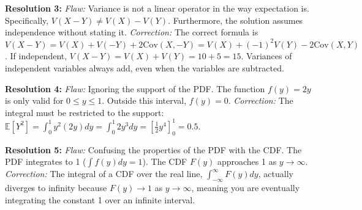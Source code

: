 \documentclass[11pt, a4paper]{article}
\theoremstyle{definition}
\theoremstyle{remark}
\newcommand{\E}{\mathbb{E}}
\begin{document}
\textbf{Resolution 3:} \textit{Flaw:} Variance is not a linear operator in the way expectation is. Specifically, $V(X - Y) \neq V(X) - V(Y)$. Furthermore, the solution assumes independence without stating it.
\textit{Correction:} The correct formula is $V(X - Y) = V(X) + V(-Y) + 2\text{Cov}(X, -Y) = V(X) + (-1)^2 V(Y) - 2\text{Cov}(X, Y)$. If independent, $V(X - Y) = V(X) + V(Y) = 10 + 5 = 15$. Variances of independent variables always add, even when the variables are subtracted.

\textbf{Resolution 4:} \textit{Flaw:} Ignoring the support of the PDF. The function $f(y) = 2y$ is only valid for $0 \le y \le 1$. Outside this interval, $f(y) = 0$.
\textit{Correction:} The integral must be restricted to the support: $\E[Y^2] = \int_{0}^{1} y^2 (2y) dy = \int_{0}^{1} 2y^3 dy = [\frac{1}{2}y^4]_0^1 = 0.5$.

\textbf{Resolution 5:} \textit{Flaw:} Confusing the properties of the PDF with the CDF. The PDF integrates to 1 ($\int f(y) dy = 1$). The CDF $F(y)$ approaches 1 as $y \to \infty$.
\textit{Correction:} The integral of a CDF over the real line, $\int_{-\infty}^{\infty} F(y) dy$, actually diverges to infinity because $F(y) \to 1$ as $y \to \infty$, meaning you are eventually integrating the constant 1 over an infinite interval.
\end{document}

